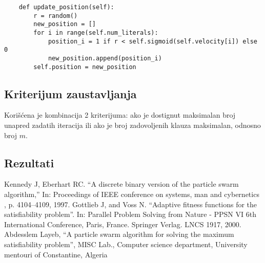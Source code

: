 \documentclass{article}
\begin{document}
\begin{lstlisting}
    def update_position(self):
        r = random()
        new_position = []
        for i in range(self.num_literals):
            position_i = 1 if r < self.sigmoid(self.velocity[i]) else 0
            new_position.append(position_i)
        self.position = new_position
\end{lstlisting}

\subsection{Kriterijum zaustavljanja}
Korišćena je kombinacija 2 kriterijuma: ako je dostignut maksimalan broj unapred zadatih iteracija ili ako je broj zadovoljenih klauza maksimalan, odnosno broj $m$.

\subsection{Rezultati}


\newpage
\begin{thebibliography}{9}
Kennedy J, Eberhart RC. “A discrete binary version of the particle swarm algorithm,” In: Proceedings of IEEE conference on systems, man and cybernetics , p. 4104–4109, 1997.
 Gottlieb J, and Voss N. “Adaptive fitness functions for the satisfiability problem”. In: Parallel Problem Solving from Nature - PPSN VI 6th International Conference, Paris, France. Springer Verlag. LNCS 1917, 2000.
\bibitem{} Abdesslem Layeb, “A particle swarm algorithm for solving the maximum satisfiability problem”, MISC Lab., Computer science department, University mentouri of Constantine, Algeria
\end{thebibliography}
\end{document}
